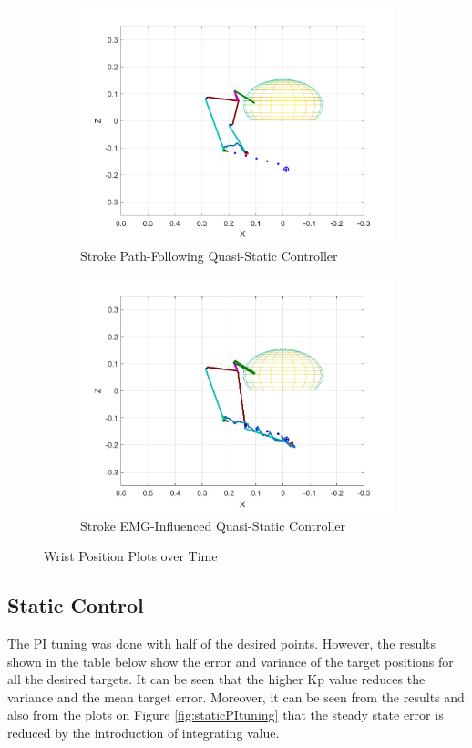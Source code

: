 \begin{figure}[ht]
    \vspace{2pt} %

    \begin{subfigure}[b]{0.5\textwidth}
        \includegraphics[width=0.75\linewidth]{Pictures/Results/Controller/StrokeWithouControl_WP.png}
        \caption{Stroke Path-Following Quasi-Static Controller}
    \end{subfigure}%
    \hfill
    \begin{subfigure}[b]{0.5\textwidth}
        \includegraphics[width=0.75\linewidth]{Pictures/Results/Controller/G(2.99)_G(14.48)_Stroke_7_position_totry(5485)_wp.jpg}
        \caption{Stroke EMG-Influenced Quasi-Static Controller}
    \end{subfigure}

    \caption{Wrist Position Plots over Time}
    \label{fig:allcontrollers}
\end{figure}

\newpage
\subsection{Static Control} \label{resultsstaticcontrol}
The PI tuning was done with half of the desired points. However, the results shown in the table below show the error and variance of the target positions for all the desired targets. It can be seen that the higher Kp value reduces the variance and the mean target error. Moreover, it can be seen from the results and also from the plots on Figure \ref{fig:staticPItuning} that the steady state error is reduced by the introduction of integrating value. 

